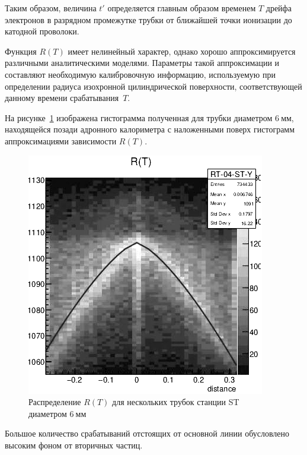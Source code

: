 Таким образом, величина $t'$ определяется главным образом временем $T$
дрейфа электронов в разрядном промежутке трубки от ближайшей точки
ионизации до катодной проволоки.

Функция $R(T)$ имеет нелинейный характер, однако хорошо аппроксимируется
различными аналитическими моделями. Параметры такой аппроксимации и
составляют необходимую калибровочную информацию, используемую при
определении радиуса изохронной цилиндрической поверхности, соответствующей
данному времени срабатывания~$T$.

На рисунке~\ref{fig:straws-rt} изображена гистограмма полученная для
трубки диаметром $6~\text{мм}$, находящейся
позади адронного калориметра с наложенными поверх гистограмм аппроксимациями
зависимости $R(T)$.
\begin{figure}
    \centering
    \includegraphics[width=0.33\linewidth]{images//illustrative/ST-RT-single-mono.png}
    \caption{Распределение $R(T)$ для нескольких трубок станции ST
    диаметром $6~\text{мм}$
    }
    \label{fig:straws-rt}
\end{figure}
Большое количество срабатываний отстоящих от основной линии обусловлено
высоким фоном от вторичных частиц.

